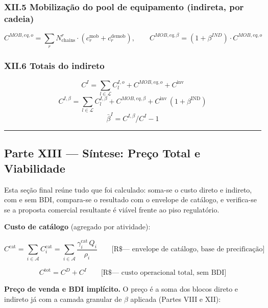 \documentclass[
  10pt,
]{article}
\begin{document}
\hypertarget{xii.5-mobilizauxe7uxe3o-do-pool-de-equipamento-indireta-por-cadeia}{%
\subsubsection{XII.5 Mobilização do pool de equipamento (indireta, por
cadeia)}\label{xii.5-mobilizauxe7uxe3o-do-pool-de-equipamento-indireta-por-cadeia}}

\[\boxed{C^{MOB,eq,o} = \sum_r N_{\text{chains}}^r\cdot(c_r^{\text{mob}}+c_r^{\text{demob}})}, \qquad C^{MOB,eq,\beta} = (1+\beta^{IND})\cdot C^{MOB,eq,o}\]

\hypertarget{xii.6-totais-do-indireto}{%
\subsubsection{XII.6 Totais do
indireto}\label{xii.6-totais-do-indireto}}

\[C^I = \sum_{l\in\mathcal{L}} C_l^{I,o} + C^{MOB,eq,o} + C^{\mathrm{inv}}\]
\[C^{I,\beta} = \sum_{l\in\mathcal{L}} C_l^{I,\beta} + C^{MOB,eq,\beta} + C^{\mathrm{inv}}\,(1+\beta^{\mathrm{IND}})\]
\[\bar\beta^I = C^{I,\beta}/C^I-1\]

\begin{center}\rule{0.5\linewidth}{0.5pt}\end{center}

\hypertarget{parte-xiii-suxedntese-preuxe7o-total-e-viabilidade}{%
\subsection{Parte XIII --- Síntese: Preço Total e
Viabilidade}\label{parte-xiii-suxedntese-preuxe7o-total-e-viabilidade}}

Esta seção final reúne tudo que foi calculado: soma-se o custo direto e
indireto, com e sem BDI, compara-se o resultado com o envelope de
catálogo, e verifica-se se a proposta comercial resultante é viável
frente ao piso regulatório.

\textbf{Custo de catálogo} (agregado por atividade):

\[C^{\mathrm{cat}} = \sum_{i\in\mathcal{A}} C_i^{\mathrm{cat}} = \sum_{i\in\mathcal{A}} \frac{\gamma_i^{\mathrm{cat}}\,Q_i}{\rho_i}\qquad\text{[R\$ — envelope de catálogo, base de precificação]}\]

\[C^{\mathrm{tot}} = C^D+C^I \qquad\text{[R\$ — custo operacional total, sem BDI]}\]

\textbf{Preço de venda e BDI implícito.} O preço é a soma dos blocos
direto e indireto já com a camada granular de \(\beta\) aplicada (Partes
VIII e XII):
\end{document}
